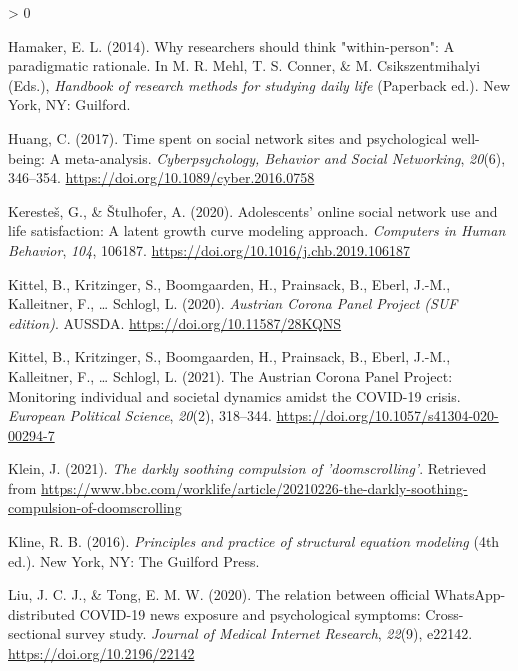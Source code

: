\documentclass[
  english,
  man,floatsintext]{apa6}
\newlength{\cslhangindent}
\newenvironment{CSLReferences}[2] %
 {%
  \setlength{\parindent}{0pt}
  \ifodd #1 \everypar{\setlength{\hangindent}{\cslhangindent}}\ignorespaces\fi
  \ifnum #2 > 0
  \setlength{\parskip}{#2\baselineskip}
  \fi
 }%
 {}
\begin{document}
\begin{CSLReferences}{1}{0}
\leavevmode\hypertarget{ref-hamakerWhyResearchersShould2014}{}%
Hamaker, E. L. (2014). Why researchers should think "within-person": {A} paradigmatic rationale. In M. R. Mehl, T. S. Conner, \& M. Csikszentmihalyi (Eds.), \emph{Handbook of research methods for studying daily life} (Paperback ed.). New York, NY: Guilford.

\leavevmode\hypertarget{ref-huangTimeSpentSocial2017}{}%
Huang, C. (2017). Time spent on social network sites and psychological well-being: {A} meta-analysis. \emph{Cyberpsychology, Behavior and Social Networking}, \emph{20}(6), 346--354. \url{https://doi.org/10.1089/cyber.2016.0758}

\leavevmode\hypertarget{ref-kerestesAdolescentsOnlineSocial2020}{}%
Keresteš, G., \& Štulhofer, A. (2020). Adolescents' online social network use and life satisfaction: {A} latent growth curve modeling approach. \emph{Computers in Human Behavior}, \emph{104}, 106187. \url{https://doi.org/10.1016/j.chb.2019.106187}

\leavevmode\hypertarget{ref-kittelAustrianCoronaPanel2020}{}%
Kittel, B., Kritzinger, S., Boomgaarden, H., Prainsack, B., Eberl, J.-M., Kalleitner, F., \ldots{} Schlogl, L. (2020). \emph{Austrian {Corona} {Panel} {Project} ({SUF} edition)}. AUSSDA. \url{https://doi.org/10.11587/28KQNS}

\leavevmode\hypertarget{ref-kittelAustrianCoronaPanel2021}{}%
Kittel, B., Kritzinger, S., Boomgaarden, H., Prainsack, B., Eberl, J.-M., Kalleitner, F., \ldots{} Schlogl, L. (2021). The {Austrian} {Corona} {Panel} {Project}: Monitoring individual and societal dynamics amidst the {COVID}-19 crisis. \emph{European Political Science}, \emph{20}(2), 318--344. \url{https://doi.org/10.1057/s41304-020-00294-7}

\leavevmode\hypertarget{ref-kleinDarklySoothingCompulsion2021}{}%
Klein, J. (2021). \emph{The darkly soothing compulsion of 'doomscrolling'}. Retrieved from \url{https://www.bbc.com/worklife/article/20210226-the-darkly-soothing-compulsion-of-doomscrolling}

\leavevmode\hypertarget{ref-klinePrinciplesPracticeStructural2016}{}%
Kline, R. B. (2016). \emph{Principles and practice of structural equation modeling} (4th ed.). New York, NY: The Guilford Press.

\leavevmode\hypertarget{ref-liuRelationOfficialWhatsAppdistributed2020}{}%
Liu, J. C. J., \& Tong, E. M. W. (2020). The relation between official {WhatsApp}-distributed {COVID}-19 news exposure and psychological symptoms: Cross-sectional survey study. \emph{Journal of Medical Internet Research}, \emph{22}(9), e22142. \url{https://doi.org/10.2196/22142}


\end{CSLReferences}
\end{document}
